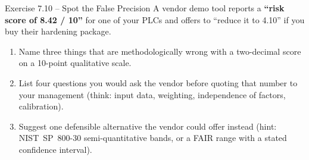 \documentclass[11pt,a4paper]{article}
\begin{document}
\begin{taskbox}{Exercise 7.10 -- Spot the False Precision}
A vendor demo tool reports a \textbf{``risk score of 8.42 / 10''} for one of
your PLCs and offers to ``reduce it to 4.10'' if you buy their hardening
package.
\begin{enumerate}
  \item Name three things that are methodologically wrong with a
        two-decimal score on a 10-point qualitative scale.
  \item List four questions you would ask the vendor before quoting
        that number to your management (think: input data, weighting,
        independence of factors, calibration).
  \item Suggest one defensible alternative the vendor could offer instead
        (hint: NIST~SP~800-30 semi-quantitative bands, or a FAIR range
        with a stated confidence interval).
\end{enumerate}
\end{taskbox}
\end{document}
